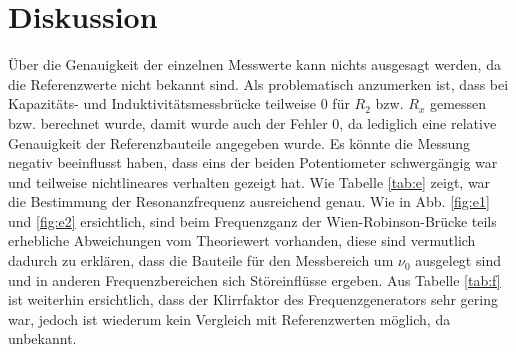 \section{Diskussion}
\label{sec:Diskussion}

Über die Genauigkeit der einzelnen Messwerte kann nichts ausgesagt werden, da die Referenzwerte nicht bekannt sind. Als problematisch anzumerken ist, dass bei Kapazitäts- und Induktivitätsmessbrücke teilweise $0$ für $R_2$ bzw. $R_x$ gemessen bzw. berechnet wurde, damit wurde auch der Fehler $0$, da lediglich eine relative Genauigkeit der Referenzbauteile angegeben wurde. Es könnte die Messung negativ beeinflusst haben, dass eins der beiden Potentiometer schwergängig war und teilweise nichtlineares verhalten gezeigt hat. Wie Tabelle \ref{tab:e} zeigt, war die Bestimmung der Resonanzfrequenz ausreichend genau. Wie in Abb. \ref{fig:e1} und \ref{fig:e2} ersichtlich, sind beim Frequenzganz der Wien-Robinson-Brücke teils erhebliche Abweichungen vom Theoriewert vorhanden, diese sind vermutlich dadurch zu erklären, dass die Bauteile für den Messbereich um $\nu_0$ ausgelegt sind und in anderen Frequenzbereichen sich Störeinflüsse ergeben. Aus Tabelle \ref{tab:f} ist weiterhin ersichtlich, dass der Klirrfaktor des Frequenzgenerators sehr gering war, jedoch ist wiederum kein Vergleich mit Referenzwerten möglich, da unbekannt.
